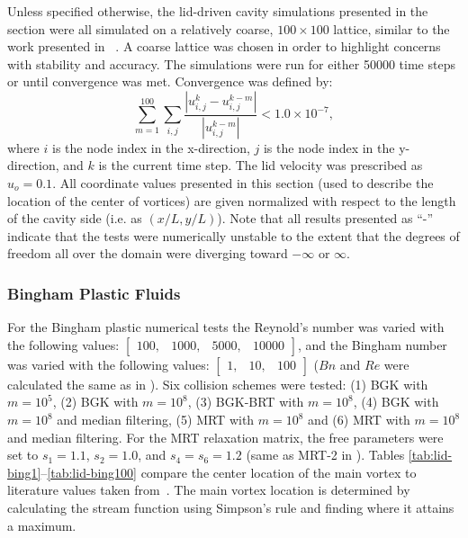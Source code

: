 Unless specified otherwise, the lid-driven cavity simulations presented in the section were all simulated on a relatively coarse, $100 \times 100$ lattice, similar to the work presented in ~\cite{brownlee2008nonequilibrium}.
A coarse lattice was chosen in order to highlight concerns with stability and accuracy.
The simulations were run for either 50000 time steps or until convergence was met.
Convergence was defined by:
\begin{equation} \label{eq:convergence}
\sum_{m=1}^{100} \sum_{i, j} \frac{|u_{i, j}^k - u_{i, j}^{k-m}|}{|u_{i, j}^{k-m}|} < 1.0 \times 10^{-7},
\end{equation}
\noindent where $i$ is the node index in the x-direction, $j$ is the node index in the y-direction, and $k$ is the current time step.
The lid velocity was prescribed as $u_o = 0.1$.
All coordinate values presented in this section (used to describe the location of the center of vortices) are given normalized with respect to the length of the cavity side (i.e. as $(x / L, y / L)$).
Note that all results presented as ``-'' indicate that the tests were numerically unstable to the extent that the degrees of freedom all over the domain were diverging toward $-\infty$ or $\infty$.

\subsubsection{Bingham Plastic Fluids}

For the Bingham plastic numerical tests the Reynold's number was varied with the following values: $\begin{bmatrix}100,&1000,&5000,&10000\end{bmatrix}$, and the Bingham number was varied with the following values: $\begin{bmatrix}1,&10,&100\end{bmatrix}$ ($Bn$ and $Re$ were calculated the same as in ).
Six collision schemes were tested: (1) BGK with $m = 10^5$, (2) BGK with $m = 10^8$, (3) BGK-BRT with $m = 10^8$, (4) BGK with $m = 10^8$ and median filtering, (5) MRT with $m = 10^8$ and (6) MRT with $m = 10^8$ and median filtering.
For the MRT relaxation matrix, the free parameters were set to $s_1 = 1.1$, $s_2 = 1.0$, and $s_4 = s_6 = 1.2$ (same as MRT-2 in ).
Tables \ref{tab:lid-bing1}--\ref{tab:lid-bing100} compare the center location of the main vortex to literature values taken from~\citet{syrakos2014performance}.
The main vortex location is determined by calculating the stream function using Simpson's rule and finding where it attains a maximum.

